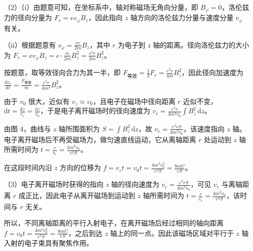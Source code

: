 \documentclass[\gkver]{gaokaozhenti}
\begin{document}
\begin{enumerate}
{（2）（i）由题意可知，在坐标系中，轴对称磁场无角向分量，即 $B_{\varphi} = 0$，洛伦兹力的径向分量为 $F_{r} = ev_{\varphi}B_{z}$，因此指向 $z$ 轴方向的洛伦兹力分量与速度分量 $v_{\varphi}$ 有关。

（ii）根据题意有 $v_{\varphi} = \frac{re}{2m}B_{z}$，其中 $r$ 为电子到 $z$ 轴的距离。径向洛伦兹力的大小为 $F_{r} = ev_{\varphi}B_{z} = e\cdot\frac{re}{2m}B_{z}^{2} = \frac{e^{2}r}{2m}B_{z}^{2}$。

按题意，取等效径向合力为其一半，即 $F_{\text{等效}} = \frac{1}{2}F_{r} = \frac{e^{2}r}{4m}B_{z}^{2}$，因此径向加速度为 $\frac{\mathrm{d}v_{r}}{\mathrm{d}t} = \frac{F_{\text{等效}}}{m} = \frac{e^{2}r}{4m^{2}}B_{z}^{2}$。

由于 $v_{0}$ 很大，近似有 $v_{z} \approx v_{0}$，且电子在磁场中径向距离 $r$ 近似不变，$\mathrm{d}t = \frac{\mathrm{d}z}{v_{z}} = \frac{\mathrm{d}z}{v_{0}}$，于是电子离开磁场时的径向速度为 $v_{r} = \frac{e^{2}r}{4m^{2}v_{0}}\int B_{z}^{2}\,\mathrm{d}z$。

由图 4，曲线与 $z$ 轴所围面积为 $S = \int B_{z}^{2}\,\mathrm{d}z$，故 $v_{r} = \frac{e^{2}rS}{4m^{2}v_{0}}$，该速度指向 $z$ 轴。电子离开磁场后不再受磁场力，做匀速直线运动，它从离轴距离 $r$ 处运动到 $z$ 轴所需时间为 $t = \frac{r}{v_{r}} = \frac{4m^{2}v_{0}}{e^{2}S}$。

在这段时间内沿 $z$ 方向的位移为 $f = v_{z}t = v_{0}t = \frac{4m^{2}v_{0}^{2}}{e^{2}S} = \frac{8mU}{eS}$。

（3）电子离开磁场时获得的指向 $z$ 轴的径向速度为 $v_{r} = \frac{e^{2}rS}{4m^{2}v_{0}}$，可见 $v_{r}$ 与离轴距离 $r$ 成正比，因此电子从离开磁场到运动到 $z$ 轴所需时间为 $t = \frac{r}{v_{r}} = \frac{4m^{2}v_{0}}{e^{2}S}$，该时间与 $r$ 无关。

所以，不同离轴距离的平行入射电子，在离开磁场后经过相同的轴向距离 $f = v_{0}t = \frac{4m^{2}v_{0}^{2}}{e^{2}S} = \frac{8mU}{eS}$，之后到达 $z$ 轴上的同一点。因此该磁场区域对平行于 $z$ 轴入射的电子束具有聚焦作用。
}

\end{enumerate}
\end{document}
